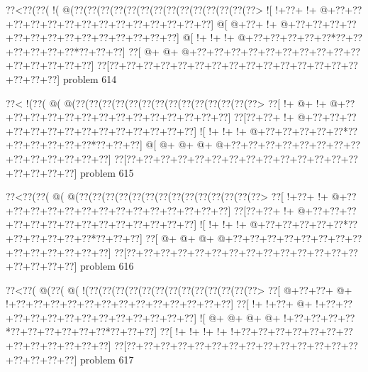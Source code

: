 \vbox{\vbox{\goo
\0??<\0??(\0??(\- !(\- @(\0??(\0??(\0??(\0??(\0??(\0??(\0??(\0??(\0??(\0??(\0??(\0??(\0??(\0??>
\- ![\- !+\0??+\- !+\- @+\0??+\0??+\0??+\0??+\0??+\0??+\0??+\0??+\0??+\0??+\0??+\0??+\0??+\0??]
\- @[\- @+\0??+\- !+\- @+\0??+\0??+\0??+\0??+\0??+\0??+\0??+\0??+\0??+\0??+\0??+\0??+\0??+\0??]
\- @[\- !+\- !+\- !+\- @+\0??+\0??+\0??+\0??+\0??*\0??+\0??+\0??+\0??+\0??+\0??*\0??+\0??+\0??]
\0??[\- @+\- @+\- @+\0??+\0??+\0??+\0??+\0??+\0??+\0??+\0??+\0??+\0??+\0??+\0??+\0??+\0??+\0??]
\0??[\0??+\0??+\0??+\0??+\0??+\0??+\0??+\0??+\0??+\0??+\0??+\0??+\0??+\0??+\0??+\0??+\0??+\0??]
}
\hfil problem 614\hfil\break
}



\vbox{\vbox{\goo
\0??<\- !(\0??(\- @(\- @(\0??(\0??(\0??(\0??(\0??(\0??(\0??(\0??(\0??(\0??(\0??(\0??(\0??(\0??>
\0??[\- !+\- @+\- !+\- @+\0??+\0??+\0??+\0??+\0??+\0??+\0??+\0??+\0??+\0??+\0??+\0??+\0??+\0??]
\0??[\0??+\0??+\- !+\- @+\0??+\0??+\0??+\0??+\0??+\0??+\0??+\0??+\0??+\0??+\0??+\0??+\0??+\0??]
\- ![\- !+\- !+\- !+\- @+\0??+\0??+\0??+\0??+\0??*\0??+\0??+\0??+\0??+\0??+\0??*\0??+\0??+\0??]
\- @[\- @+\- @+\- @+\- @+\0??+\0??+\0??+\0??+\0??+\0??+\0??+\0??+\0??+\0??+\0??+\0??+\0??+\0??]
\0??[\0??+\0??+\0??+\0??+\0??+\0??+\0??+\0??+\0??+\0??+\0??+\0??+\0??+\0??+\0??+\0??+\0??+\0??]
}
\hfil problem 615\hfil\break
}



\vbox{\vbox{\goo
\0??<\0??(\0??(\- @(\- @(\0??(\0??(\0??(\0??(\0??(\0??(\0??(\0??(\0??(\0??(\0??(\0??(\0??(\0??>
\0??[\- !+\0??+\- !+\- @+\0??+\0??+\0??+\0??+\0??+\0??+\0??+\0??+\0??+\0??+\0??+\0??+\0??+\0??]
\0??[\0??+\0??+\- !+\- @+\0??+\0??+\0??+\0??+\0??+\0??+\0??+\0??+\0??+\0??+\0??+\0??+\0??+\0??]
\- ![\- !+\- !+\- !+\- @+\0??+\0??+\0??+\0??+\0??*\0??+\0??+\0??+\0??+\0??+\0??*\0??+\0??+\0??]
\0??[\- @+\- @+\- @+\- @+\0??+\0??+\0??+\0??+\0??+\0??+\0??+\0??+\0??+\0??+\0??+\0??+\0??+\0??]
\0??[\0??+\0??+\0??+\0??+\0??+\0??+\0??+\0??+\0??+\0??+\0??+\0??+\0??+\0??+\0??+\0??+\0??+\0??]
}
\hfil problem 616\hfil\break
}



\vbox{\vbox{\goo
\0??<\0??(\- @(\0??(\- @(\- !(\0??(\0??(\0??(\0??(\0??(\0??(\0??(\0??(\0??(\0??(\0??(\0??(\0??>
\0??[\- @+\0??+\0??+\- @+\- !+\0??+\0??+\0??+\0??+\0??+\0??+\0??+\0??+\0??+\0??+\0??+\0??+\0??]
\0??[\- !+\- !+\0??+\- @+\- !+\0??+\0??+\0??+\0??+\0??+\0??+\0??+\0??+\0??+\0??+\0??+\0??+\0??]
\- ![\- @+\- @+\- @+\- @+\- !+\0??+\0??+\0??+\0??*\0??+\0??+\0??+\0??+\0??+\0??*\0??+\0??+\0??]
\0??[\- !+\- !+\- !+\- !+\- !+\0??+\0??+\0??+\0??+\0??+\0??+\0??+\0??+\0??+\0??+\0??+\0??+\0??]
\0??[\0??+\0??+\0??+\0??+\0??+\0??+\0??+\0??+\0??+\0??+\0??+\0??+\0??+\0??+\0??+\0??+\0??+\0??]
}
\hfil problem 617\hfil\break
}



